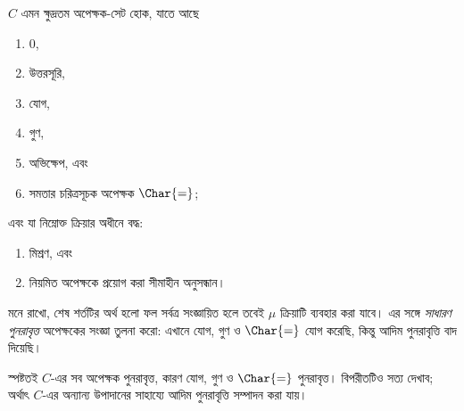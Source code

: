\documentclass[../../../include/open-logic-section]{subfiles}
\begin{document}

$C$ এমন ক্ষুদ্রতম অপেক্ষক-সেট হোক, যাতে আছে
\begin{enumerate}
\item $0$,
\item উত্তরসূরি,
\item যোগ,
\item গুণ,
\item অভিক্ষেপ, এবং
\item সমতার চরিত্রসূচক অপেক্ষক $\Char{=}$;
\end{enumerate}
এবং যা নিম্নোক্ত ক্রিয়ার অধীনে বদ্ধ:
\begin{enumerate}
\item মিশ্রণ, এবং
\item নিয়মিত অপেক্ষকে প্রয়োগ করা সীমাহীন অনুসন্ধান।
\end{enumerate}
মনে রাখো, শেষ শর্তটির অর্থ হলো ফল সর্বত্র সংজ্ঞায়িত হলে তবেই
$\mu$ ক্রিয়াটি ব্যবহার করা যাবে। এর সঙ্গে \emph{সাধারণ পুনরাবৃত্ত}
অপেক্ষকের সংজ্ঞা তুলনা করো: এখানে যোগ, গুণ ও $\Char{=}$ যোগ করেছি,
কিন্তু আদিম পুনরাবৃত্তি বাদ দিয়েছি।

স্পষ্টতই $C$-এর সব অপেক্ষক পুনরাবৃত্ত, কারণ যোগ, গুণ ও
$\Char{=}$ পুনরাবৃত্ত। বিপরীতটিও সত্য দেখাব; অর্থাৎ $C$-এর অন্যান্য
উপাদানের সাহায্যে আদিম পুনরাবৃত্তি সম্পাদন করা যায়।
\end{document}
